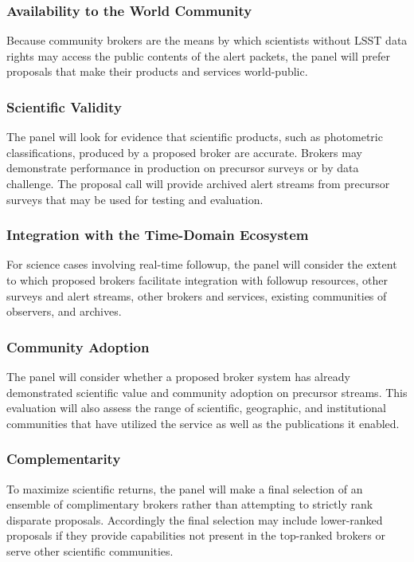 \subsubsection{Availability to the World Community}

Because community brokers are the means by which scientists without LSST data rights may access the public contents of the alert packets, the panel will prefer proposals that make their products and services world-public.

\subsubsection{Scientific Validity}

The panel will look for evidence that scientific products, such as photometric classifications, produced by a proposed broker are accurate.  
Brokers may demonstrate performance in production on precursor surveys or by data challenge.
The proposal call will provide archived alert streams from precursor surveys that may be used for testing and evaluation.

\subsubsection{Integration with the Time-Domain Ecosystem}

For science cases involving real-time followup, the panel will consider the extent to which proposed brokers facilitate integration with followup resources, other surveys and alert streams, other brokers and services, existing communities of observers, and archives.  	


\subsubsection{Community Adoption}

The panel will consider whether a proposed broker system has already demonstrated scientific value and community adoption on precursor streams.  
This evaluation will also assess the 
range of scientific, geographic, and institutional communities that have utilized the service as well as the publications it enabled.


\subsubsection{Complementarity}

To maximize scientific returns, the panel will make a final selection of an ensemble of complimentary brokers rather than attempting to strictly rank disparate proposals.   Accordingly the final selection may include lower-ranked proposals if they provide capabilities not present in the top-ranked brokers or serve other scientific communities.

